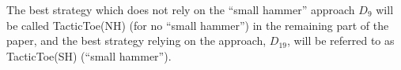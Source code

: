 \documentclass[runningheads,a4paper,draft]{svjour3}
\def\tactictoe{\textsf{TacticToe}\xspace}
\newcommand{\ra}[1]{\renewcommand{\arraystretch}{#1}}
\begin{document}

The best strategy which does not rely on the ``small hammer'' approach $D_9$ 
will be called \tactictoe(NH) (for no ``small hammer'') in the remaining part 
of the paper, and the best strategy relying on the approach, $D_{19}$, will be 
referred to as \tactictoe(SH) (``small hammer'').

\end{document}
